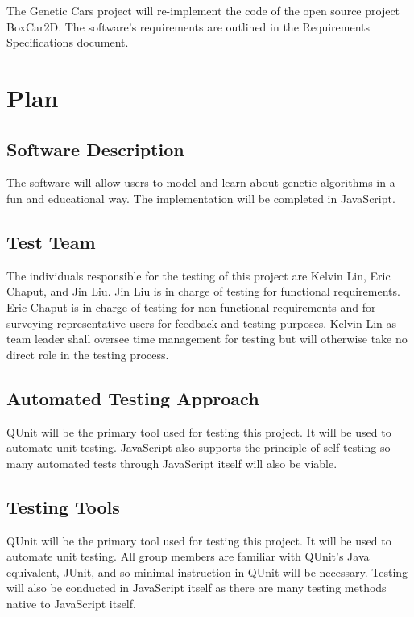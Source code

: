 \documentclass[12pt, titlepage]{article}
\begin{document}
The Genetic Cars project will re-implement the code of the open source project 
BoxCar2D. The software's requirements are outlined in the Requirements 
Specifications document.

\section{Plan}
	
\subsection{Software Description}

The software will allow users to model and learn about genetic algorithms in a 
fun and educational way. The implementation will be completed in JavaScript.

\subsection{Test Team}

The individuals responsible for the testing of this project are  Kelvin Lin, 
Eric Chaput, and  Jin Liu. Jin Liu is in charge of testing for functional 
requirements. Eric Chaput is in charge of testing for non-functional 
requirements and for surveying representative users for feedback and testing 
purposes. Kelvin Lin as team leader shall oversee time management for testing 
but will otherwise take no direct role in the testing process.

\subsection{Automated Testing Approach}

QUnit will be the primary tool used for testing this project. It will be used to 
automate unit testing. JavaScript also supports the principle of self-testing so 
many automated tests through JavaScript itself will also be viable.

\subsection{Testing Tools}

QUnit will be the primary tool used for testing this project. It will be used to 
automate unit testing. All group members are familiar with QUnit's Java 
equivalent, JUnit, and so minimal instruction in QUnit will be necessary. 
Testing will also be conducted in JavaScript itself as there are many testing 
methods native to JavaScript itself.
\end{document}

